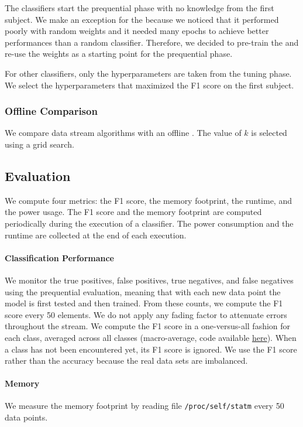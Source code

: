 The classifiers start the prequential phase with
no knowledge from the first subject.  We make an
exception for the \FNN because we noticed that it
performed poorly with random weights and it needed
many epochs to achieve better performances than a
random  classifier. Therefore, we decided to
pre-train the \FNN and re-use the weights as a
starting point for the prequential phase.

For other classifiers, only the 
hyperparameters are taken from the tuning phase.
We select the hyperparameters that 
maximized the F1 score on the first subject.

\subsubsection{Offline Comparison}
We compare data stream algorithms with an offline \knn. The value of $k$ is
selected using a grid search.

\subsection{Evaluation}
We compute four metrics: the F1 score, the memory
footprint, the runtime, and the power usage.
The F1 score and the memory
footprint are computed periodically during the
execution of a classifier. The
power consumption and the runtime are collected
at the end of each execution.

\paragraph{Classification Performance}
We monitor the true positives, false positives,
true negatives, and false negatives using the
prequential evaluation, meaning that with each new
data point the model is first tested and then
trained.  From these counts, we compute the
F1 score every 50 elements. We do not apply any
fading factor to attenuate errors throughout the
stream.  We compute the F1 score in a
one-versus-all fashion for each class, averaged
across all classes (macro-average, code available
\href{https://github.com/azazel7/paper-benchmark/blob/9adb1039c5a65a00a66d554f0e870d14d3fff7cb/main.cpp\#L82}{here}).
When a class has not been encountered yet, its
F1 score is ignored. We use the F1 score rather
than the accuracy because the real data sets are
imbalanced.


\paragraph{Memory}
We measure the memory footprint by reading file
\texttt{/proc/self/statm} every 50 data points.

